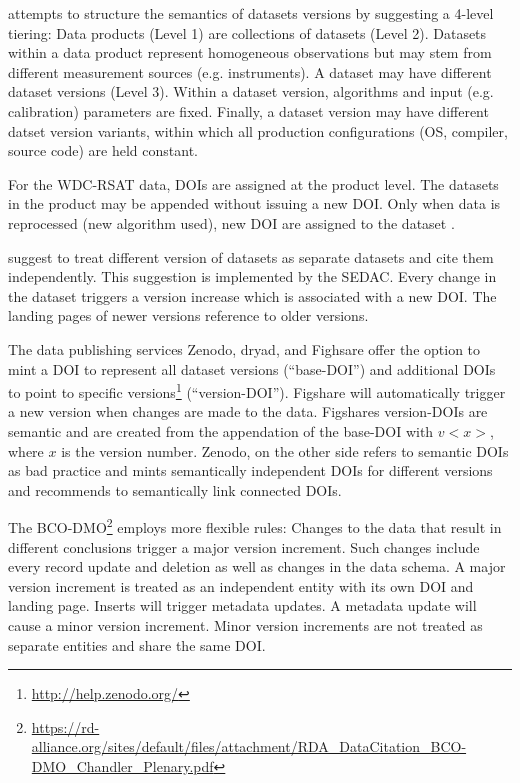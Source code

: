 \documentclass[a4paper,10pt]{article}
\begin{document}
\cite{Barkstrom2003} attempts to structure the semantics of datasets versions by suggesting a 4-level tiering: Data products (Level 1) are collections of datasets (Level 2). Datasets within a data product represent homogeneous observations but may stem from different measurement sources (e.g. instruments). A dataset may have different dataset versions (Level 3). Within a dataset version, algorithms and input (e.g. calibration) parameters are fixed. Finally, a dataset version may have different datset version variants, within which all production configurations (OS, compiler, source code) are held constant.

For the WDC-RSAT data, \glspl{DOI} are assigned at the product level. The datasets in the product may be appended without issuing a new DOI. Only when data is reprocessed (new algorithm used), new DOI are assigned to the dataset \citep{Huber2015}.

\citep{AltKin07} suggest to treat different version of datasets as separate datasets and cite them independently. This suggestion is implemented by the \gls{SEDAC}\cite{Downs2013}. Every change in the dataset triggers a version increase which is associated with a new \gls{DOI}. The landing pages of newer versions reference to older versions. 

The data publishing services Zenodo, dryad, and Fighsare offer the option to mint a \gls{DOI} to represent all dataset versions (``base-DOI'') and additional \glspl{DOI} to point to specific versions\footnote{\url{http://help.zenodo.org/}} (``version-DOI''). Figshare will automatically trigger a new version when changes are made to the data. Figshares version-\glspl{DOI} are semantic and are created from the appendation of the base-DOI with $v<x>$, where $x$ is the version number. Zenodo, on the other side refers to semantic \glspl{DOI} as bad practice and mints semantically independent \glspl{DOI} for different versions and recommends to semantically link connected \glspl{DOI}.

The \gls{BCO-DMO}\footnote{\url{https://rd-alliance.org/sites/default/files/attachment/RDA_DataCitation_BCO-DMO_Chandler_Plenary.pdf}} employs more flexible rules: Changes to the data that result in different conclusions trigger a major version increment. 
Such changes include every record update and deletion as well as changes in the data schema.
A major version increment is treated as an independent entity with its own \gls{DOI} and landing page. Inserts will trigger metadata updates. A metadata update will cause a minor version increment. Minor version increments are not treated as separate entities and share the same \gls{DOI}.
\end{document}
